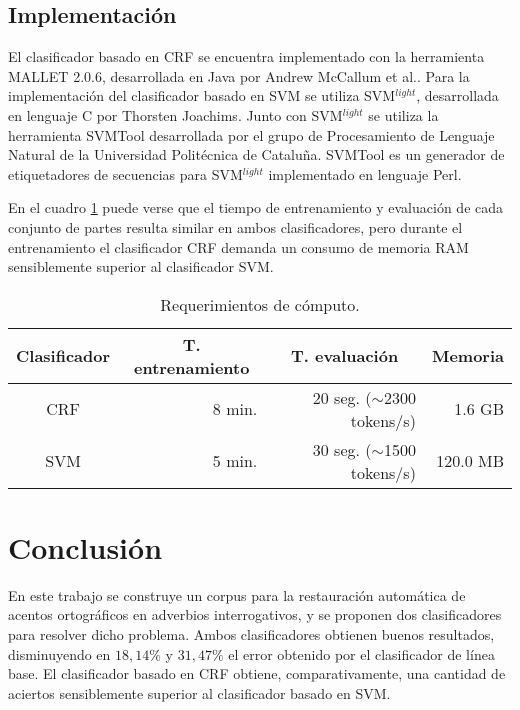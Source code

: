 \documentclass[runningheads,a4paper]{llncs}
\begin{document}
\subsection{Implementación}
El clasificador basado en CRF se encuentra implementado con la herramienta MALLET 2.0.6, desarrollada en Java por Andrew McCallum et al.\cite{MCCALLUM02}. Para la implementaci\'on del clasificador basado en SVM se utiliza SVM$^{light}$, desarrollada en lenguaje C por Thorsten Joachims\cite{JOACHIMS08}. Junto con SVM$^{light}$ se utiliza la herramienta SVMTool desarrollada por el grupo de Procesamiento de Lenguaje Natural de la Universidad Politécnica de Cataluña\cite{GIMENEZ04}\cite{GIMENEZ06}. SVMTool es un generador de etiquetadores de secuencias para SVM$^{light}$ implementado en lenguaje Perl. 

En el cuadro \ref{table:tiempo-entrenamiento} puede verse que el tiempo de entrenamiento y evaluación de cada conjunto de partes resulta similar en ambos clasificadores, pero durante el entrenamiento el clasificador CRF demanda un consumo de memoria RAM sensiblemente superior al clasificador SVM.

\begin{table}[ht]
 	\renewcommand{\arraystretch}{1.3}
	\renewcommand{\tabcolsep}{3pt}
	\caption{Requerimientos de c\'omputo.}
	\label{table:tiempo-entrenamiento}
	\centering
	\begin{tabular}{c r r r}
		\hline\hline
		\multicolumn{1}{c}{\textbf{Clasificador}} 
		& \multicolumn{1}{c}{\textbf{T. entrenamiento}} 
		& \multicolumn{1}{c}{\textbf{T. evaluaci\'on}} 
		& \multicolumn{1}{c}{\textbf{Memoria}} \\
		\hline
		CRF & 8 min. & 20 seg. ($\sim$2300 tokens/s) & 1.6 GB \\
		SVM & 5 min. & 30 seg. ($\sim$1500 tokens/s) & 120.0 MB \\
		\hline
	\end{tabular}
\end{table}

\section{Conclusión}
\label{sec:Conclusiones}

En este trabajo se construye un corpus para la restauración automática de acentos ortográficos en adverbios interrogativos, y se proponen dos clasificadores para resolver dicho problema. Ambos clasificadores obtienen buenos resultados, disminuyendo en $18,14\%$ y $31,47\%$ el error obtenido por el clasificador de línea base. El clasificador basado en CRF obtiene, comparativamente, una cantidad de aciertos sensiblemente superior al clasificador basado en SVM. 
\end{document}
